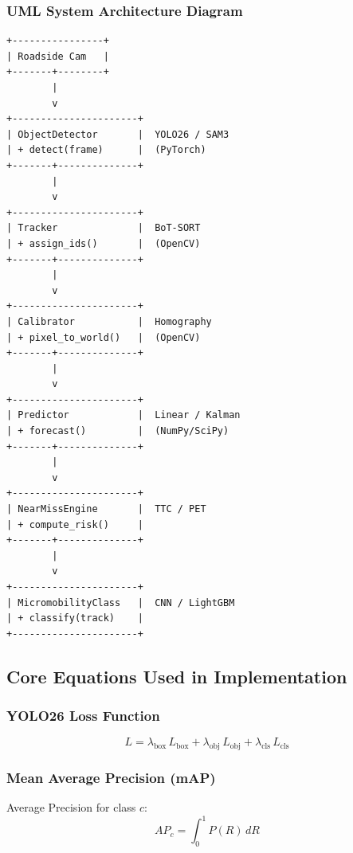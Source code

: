 \documentclass[12pt,letterpaper]{article}
\begin{document}
\subsubsection{UML System Architecture Diagram}

\begin{verbatim}
+----------------+
| Roadside Cam   |
+-------+--------+
        |
        v
+----------------------+
| ObjectDetector       |  YOLO26 / SAM3
| + detect(frame)      |  (PyTorch)
+-------+--------------+
        |
        v
+----------------------+
| Tracker              |  BoT-SORT
| + assign_ids()       |  (OpenCV)
+-------+--------------+
        |
        v
+----------------------+
| Calibrator           |  Homography
| + pixel_to_world()   |  (OpenCV)
+-------+--------------+
        |
        v
+----------------------+
| Predictor            |  Linear / Kalman
| + forecast()         |  (NumPy/SciPy)
+-------+--------------+
        |
        v
+----------------------+
| NearMissEngine       |  TTC / PET
| + compute_risk()     |
+-------+--------------+
        |
        v
+----------------------+
| MicromobilityClass   |  CNN / LightGBM
| + classify(track)    |
+----------------------+
\end{verbatim}

\subsection{Core Equations Used in Implementation}

\subsubsection{YOLO26 Loss Function}

\begin{equation}
L = \lambda_{\text{box}}\, L_{\text{box}} + \lambda_{\text{obj}}\, L_{\text{obj}} + \lambda_{\text{cls}}\, L_{\text{cls}}
\end{equation}

\subsubsection{Mean Average Precision (mAP)}

Average Precision for class $c$:
\begin{equation}
AP_c = \int_0^1 P(R)\, dR
\end{equation}
\end{document}
